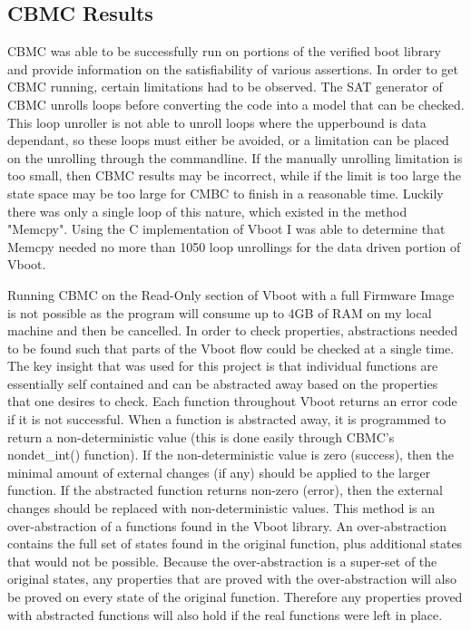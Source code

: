 \documentclass[../report.tex]{subfiles}
\begin{document}
\subsection{CBMC Results}

CBMC was able to be successfully run on portions of the verified boot library and provide information on the satisfiability of various assertions.
In order to get CBMC running, certain limitations had to be observed.
The SAT generator of CBMC unrolls loops before converting the code into a model that can be checked.
This loop unroller is not able to unroll loops where the upperbound is data dependant, so these loops must either be avoided, or a limitation can be placed on the unrolling through the commandline. 
If the manually unrolling limitation is too small, then CBMC results may be incorrect, while if the limit is too large the state space may be too large for CMBC to finish in a reasonable time.
Luckily there was only a single loop of this nature, which existed in the method "Memcpy".
Using the C implementation of Vboot I was able to determine that Memcpy needed no more than 1050 loop unrollings for the data driven portion of Vboot.

Running CBMC on the Read-Only section of Vboot with a full Firmware Image is not possible as the program will consume up to 4GB of RAM on my local machine and then be cancelled.
In order to check properties, abstractions needed to be found such that parts of the Vboot flow could be checked at a single time.
The key insight that was used for this project is that individual functions are essentially self contained and can be abstracted away based on the properties that one desires to check.
Each function throughout Vboot returns an error code if it is not successful.
When a function is abstracted away, it is programmed to return a non-deterministic value (this is done easily through CBMC's nondet\_int() function).
If the non-deterministic value is zero (success), then the minimal amount of external changes (if any) should be applied to the larger function.
If the abstracted function returns non-zero (error), then the external changes should be replaced with non-deterministic values.
This method is an over-abstraction of a functions found in the Vboot library.
An over-abstraction contains the full set of states found in the original function, plus additional states that would not be possible.
Because the over-abstraction is a super-set of the original states, any properties that are proved with the over-abstraction will also be proved on every state of the original function.
Therefore any properties proved with abstracted functions will also hold if the real functions were left in place.
\end{document}
